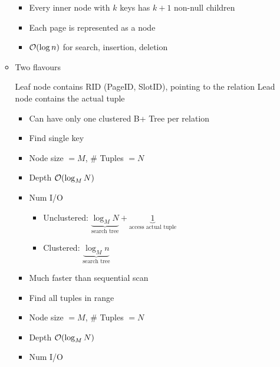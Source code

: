 \begin{itemize}
\begin{itemize}
\begin{itemize}
                    \item Every inner node with $k$ keys has $k + 1$ non-null children
                    \item Each page is represented as a node
                    \item $\mathcal{O}(\log n)$ for search, insertion, deletion
                \end{itemize}
            \item Two flavours
                \begin{itemize}
                     Leaf node contains RID (PageID, SlotID), pointing to the relation
                     Lead node contains the actual tuple
                        \begin{itemize}
                            \item Can have only one clustered B+ Tree per relation
                        \end{itemize}
                \end{itemize}
                \begin{itemize}
                    \item Find single key
                    \item Node size $= M$, $\#$ Tuples $= N$
                    \item Depth $\mathcal{O}(\log_M N)$
                    \item Num I/O
                        \begin{itemize}
                            \item Unclustered: $\underbrace{\log_M N}_{\text{search tree}} + \underbrace{1}_{\text{access actual tuple}}$
                            \item Clustered: $\underbrace{\log_M n}_{\text{search tree}}$
                        \end{itemize}
                    \item Much faster than sequential scan
                \end{itemize}
                \begin{itemize}
                    \item Find all tuples in range
                    \item Node size $= M$, $\#$ Tuples $= N$
                    \item Depth $\mathcal{O}(\log_M N)$
                    \item Num I/O

\end{itemize}
\end{itemize}
\end{itemize}
